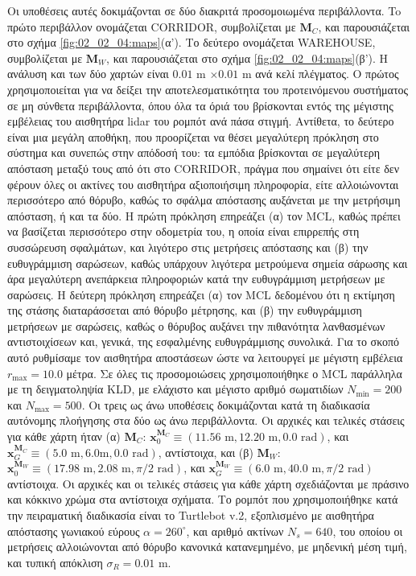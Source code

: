 Οι υποθέσεις αυτές δοκιμάζονται σε δύο διακριτά προσομοιωμένα περιβάλλοντα. To
πρώτο περιβάλλον ονομάζεται CORRIDOR, συμβολίζεται με $\bm{M}_C$, και
παρουσιάζεται στο σχήμα \ref{fig:02_02_04:maps}(α'). Το δεύτερο ονομάζεται
WAREHOUSE, συμβολίζεται με $\bm{M}_W$, και παρουσιάζεται στο σχήμα
\ref{fig:02_02_04:maps}(β'). Η ανάλυση και των δύο χαρτών είναι $0.01$ m
$\times0.01$ m ανά κελί πλέγματος. Ο πρώτος χρησιμοποιείται για να δείξει την
αποτελεσματικότητα του προτεινόμενου συστήματος σε μη σύνθετα περιβάλλοντα,
όπου όλα τα όριά του βρίσκονται εντός της μέγιστης εμβέλειας του αισθητήρα
lidar του ρομπότ ανά πάσα στιγμή.  Αντίθετα, το δεύτερο είναι μια μεγάλη
αποθήκη, που προορίζεται να θέσει μεγαλύτερη πρόκληση στο σύστημα και συνεπώς
στην απόδοσή του: τα εμπόδια βρίσκονται σε μεγαλύτερη απόσταση μεταξύ τους από
ότι στο CORRIDOR, πράγμα που σημαίνει ότι είτε δεν φέρουν όλες οι ακτίνες του
αισθητήρα αξιοποιήσιμη πληροφορία, είτε αλλοιώνονται περισσότερο από θόρυβο,
καθώς το σφάλμα απόστασης αυξάνεται με την μετρήσιμη απόσταση, ή και τα δύο. Η
πρώτη πρόκληση επηρεάζει (α) τον MCL, καθώς πρέπει να βασίζεται περισσότερο
στην οδομετρία του, η οποία είναι επιρρεπής στη συσσώρευση σφαλμάτων, και
λιγότερο στις μετρήσεις απόστασης και (β) την ευθυγράμμιση σαρώσεων, καθώς
υπάρχουν λιγότερα μετρούμενα σημεία σάρωσης και άρα μεγαλύτερη ανεπάρκεια
πληροφοριών κατά την ευθυγράμμιση μετρήσεων με σαρώσεις. Η δεύτερη πρόκληση
επηρεάζει (α) τον MCL δεδομένου ότι η εκτίμηση της στάσης διαταράσσεται από
θόρυβο μέτρησης, και (β) την ευθυγράμμιση μετρήσεων με σαρώσεις, καθώς ο
θόρυβος αυξάνει την πιθανότητα λανθασμένων αντιστοιχίσεων και, γενικά, της
εσφαλμένης ευθυγράμμισης συνολικά. Για το σκοπό αυτό ρυθμίσαμε τον αισθητήρα
αποστάσεων ώστε να λειτουργεί με μέγιστη εμβέλεια $r_{\max} = 10.0$ μέτρα.  Σε
όλες τις προσομοιώσεις χρησιμοποιήθηκε ο MCL παράλληλα με τη δειγματοληψία KLD,
με ελάχιστο και μέγιστο αριθμό σωματιδίων $N_{\min}=200$ και $N_{\max}=500$.
Οι τρεις ως άνω υποθέσεις δοκιμάζονται κατά τη διαδικασία αυτόνομης πλοήγησης
στα δύο ως άνω περιβάλλοντα. Οι αρχικές και τελικές στάσεις για κάθε χάρτη ήταν
(α) $\bm{M}_C$: $\bm{x}_0^{\bm{M}_C} \equiv (11.56\text{ m}, 12.20\text{ m},
0.0 \text{ rad})$, και $\bm{x}_G^{\bm{M}_C} \equiv (5.0 \text{ m}, 6.0 \text{
  m}, 0.0 \text{ rad})$, αντίστοιχα, και (β) $\bm{M}_W$: $\bm{x}_0^{\bm{M}_W}
\equiv (17.98 \text{ m}, 2.08 \text{ m}, \pi/2 \text{ rad})$, και
$\bm{x}_G^{\bm{M}_W} \equiv (6.0 \text{ m}, 40.0 \text{ m}, \pi/2 \text{ rad})$
αντίστοιχα. Οι αρχικές και οι τελικές στάσεις για κάθε χάρτη σχεδιάζονται με
πράσινο και κόκκινο χρώμα στα αντίστοιχα σχήματα.  Το ρομπότ που
χρησιμοποιήθηκε κατά την πειραματική διαδικασία είναι το Turtlebot v.2,
εξοπλισμένο με αισθητήρα απόστασης γωνιακού εύρους $\alpha = 260^{\circ}$, και
αριθμό ακτίνων $N_s = 640$, του οποίου οι μετρήσεις αλλοιώνονται από θόρυβο
κανονικά κατανεμημένο, με μηδενική μέση τιμή, και τυπική απόκλιση $\sigma_R =
0.01$ m.

